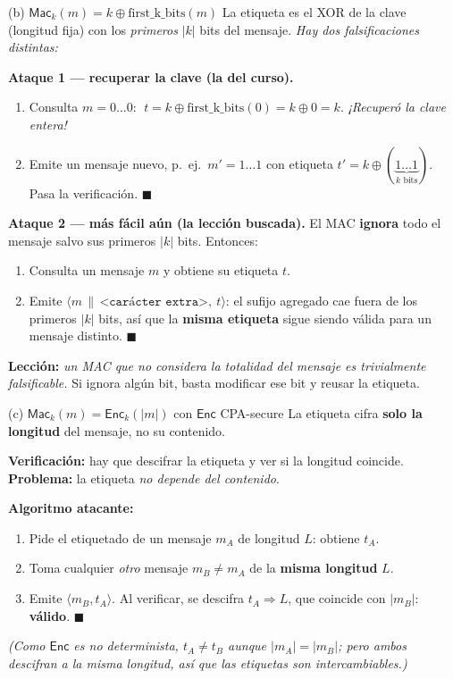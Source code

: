 \documentclass[11pt,a4paper]{article}
\newcommand{\xor}{\oplus}
\newcommand{\concat}{\,\|\,}
\newcommand{\Mac}{\mathsf{Mac}}
\newcommand{\Enc}{\mathsf{Enc}}
\begin{document}
\begin{practbox}{(b) $\Mac_k(m)=k\xor \mathrm{first\_k\_bits}(m)$}
La etiqueta es el XOR de la clave (longitud fija) con los \emph{primeros} $|k|$ bits del
mensaje. \emph{Hay dos falsificaciones distintas:}

\medskip
\textbf{Ataque 1 — recuperar la clave (la del curso).}
\begin{enumerate}[leftmargin=1.6em,itemsep=1pt]
  \item Consulta $m=0\ldots0$: $\;t=k\xor \mathrm{first\_k\_bits}(0)=k\xor 0=\boxed{k}$.
        \emph{¡Recuperó la clave entera!}
  \item Emite un mensaje nuevo, p.\ ej.\ $m'=1\ldots1$ con etiqueta
        $t'=k\xor(\underbrace{1\ldots1}_{k\text{ bits}})$. Pasa la verificación. $\blacksquare$
\end{enumerate}

\medskip
\textbf{Ataque 2 — más fácil aún (la lección buscada).} El MAC \textbf{ignora} todo el
mensaje salvo sus primeros $|k|$ bits. Entonces:
\begin{enumerate}[leftmargin=1.6em,itemsep=1pt]
  \item Consulta un mensaje $m$ y obtiene su etiqueta $t$.
  \item Emite $\langle m\concat\texttt{<carácter extra>},\ t\rangle$: el sufijo agregado cae
        fuera de los primeros $|k|$ bits, así que la \textbf{misma etiqueta} sigue siendo
        válida para un mensaje distinto. $\blacksquare$
\end{enumerate}
\textbf{Lección:} \emph{un MAC que no considera la totalidad del mensaje es trivialmente
falsificable.} Si ignora algún bit, basta modificar ese bit y reusar la etiqueta.
\end{practbox}

\begin{practbox}{(c) $\Mac_k(m)=\Enc_k(|m|)$ con $\Enc$ CPA-secure}
La etiqueta cifra \textbf{solo la longitud} del mensaje, no su contenido.

\medskip
\textbf{Verificación:} hay que descifrar la etiqueta y ver si la longitud coincide.
\textbf{Problema:} la etiqueta \emph{no depende del contenido}.

\medskip
\textbf{Algoritmo atacante:}
\begin{enumerate}[leftmargin=1.6em,itemsep=1pt]
  \item Pide el etiquetado de un mensaje $m_A$ de longitud $L$: obtiene $t_A$.
  \item Toma cualquier \emph{otro} mensaje $m_B\neq m_A$ de la \textbf{misma longitud} $L$.
  \item Emite $\langle m_B, t_A\rangle$. Al verificar, se descifra $t_A\Rightarrow L$, que
        coincide con $|m_B|$: \textbf{válido}. $\blacksquare$
\end{enumerate}
\emph{(Como $\Enc$ es no determinista, $t_A\neq t_B$ aunque $|m_A|=|m_B|$; pero ambos
descifran a la misma longitud, así que las etiquetas son intercambiables.)}
\end{practbox}
\end{document}
